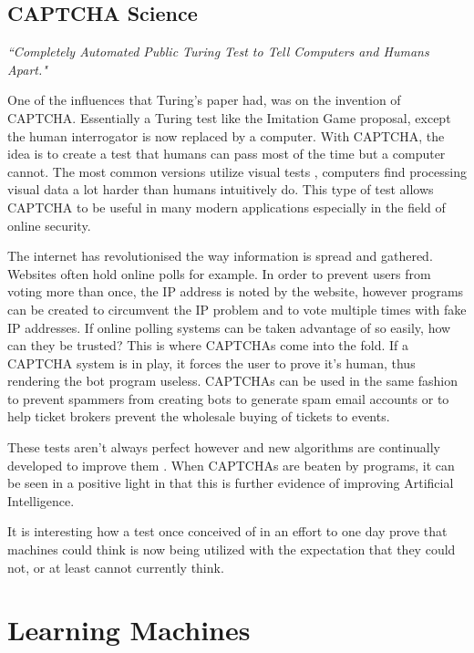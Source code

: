\documentclass{scrartcl}
\begin{document}
\subsection{CAPTCHA Science}

\textit{\textquotedblleft Completely Automated Public Turing Test to Tell Computers and Humans Apart."}

One of the influences that Turing's paper had, was on the invention of CAPTCHA. Essentially a Turing test like the Imitation Game proposal, except the human interrogator is now replaced by a computer\cite{von2004telling:6}. With CAPTCHA, the idea is to create a test that humans can pass most of the time but a computer cannot. The most common versions utilize visual tests \cite{fischer2006visual:7}, computers find processing visual data a lot harder than humans intuitively do. This type of test allows CAPTCHA to be useful in many modern applications especially in the field of online security. 

The internet has revolutionised the way information is spread and gathered. Websites often hold online polls for example. In order to prevent users from voting more than once, the IP address is noted by the website, however programs can be created to circumvent the IP problem and to vote multiple times with fake IP addresses. If online polling systems can be taken advantage of so easily, how can they be trusted?  This is where CAPTCHAs come into the fold. If a CAPTCHA system is in play, it forces the user to prove it's human, thus rendering the bot program useless. CAPTCHAs can be used in the same fashion to prevent spammers from creating bots to generate spam email accounts or to help ticket brokers prevent the wholesale buying of tickets to events.

These tests aren't always perfect however and new algorithms are continually developed to improve them \cite{mori2003recognizing:8}. When CAPTCHAs are beaten by programs, it can be seen in a positive light in that this is further evidence of improving Artificial Intelligence.

It is interesting how a test once conceived of in an effort to one day prove that machines could think is now being utilized with the expectation that they could not, or at least cannot currently think. 




\section{Learning Machines}
\end{document}
